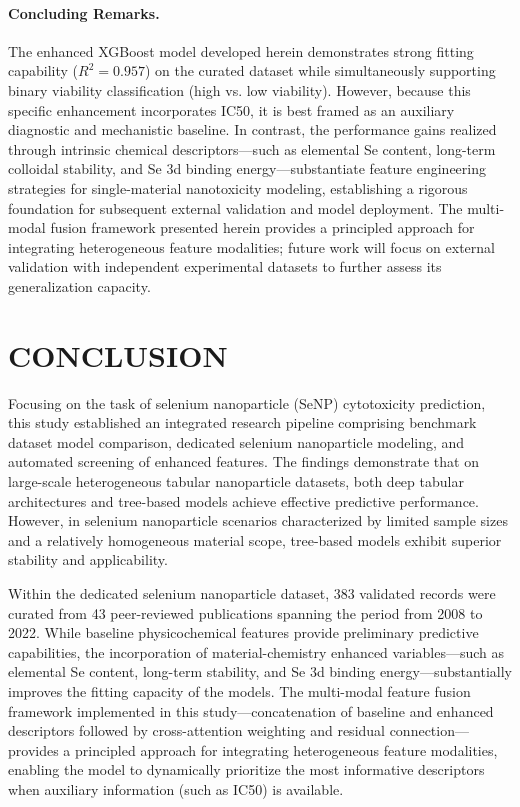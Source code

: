 \documentclass[letterpaper]{article}
\begin{document}
\paragraph{Concluding Remarks.}
The enhanced XGBoost model developed herein demonstrates strong fitting capability ($R^2 = 0.957$) on the curated dataset while simultaneously supporting binary viability classification (high vs. low viability). However, because this specific enhancement incorporates IC50, it is best framed as an auxiliary diagnostic and mechanistic baseline. In contrast, the performance gains realized through intrinsic chemical descriptors—such as elemental Se content, long-term colloidal stability, and Se 3d binding energy—substantiate feature engineering strategies for single-material nanotoxicity modeling, establishing a rigorous foundation for subsequent external validation and model deployment. The multi-modal fusion framework presented herein provides a principled approach for integrating heterogeneous feature modalities; future work will focus on external validation with independent experimental datasets to further assess its generalization capacity.

\section{CONCLUSION}

Focusing on the task of selenium nanoparticle (SeNP) cytotoxicity prediction, this study established an integrated research pipeline comprising benchmark dataset model comparison, dedicated selenium nanoparticle modeling, and automated screening of enhanced features. The findings demonstrate that on large-scale heterogeneous tabular nanoparticle datasets, both deep tabular architectures and tree-based models achieve effective predictive performance. However, in selenium nanoparticle scenarios characterized by limited sample sizes and a relatively homogeneous material scope, tree-based models exhibit superior stability and applicability.

Within the dedicated selenium nanoparticle dataset, 383 validated records were curated from 43 peer-reviewed publications spanning the period from 2008 to 2022. While baseline physicochemical features provide preliminary predictive capabilities, the incorporation of material-chemistry enhanced variables—such as elemental Se content, long-term stability, and Se 3d binding energy—substantially improves the fitting capacity of the models. The multi-modal feature fusion framework implemented in this study—concatenation of baseline and enhanced descriptors followed by cross-attention weighting and residual connection—provides a principled approach for integrating heterogeneous feature modalities, enabling the model to dynamically prioritize the most informative descriptors when auxiliary information (such as IC50) is available.
\end{document}
